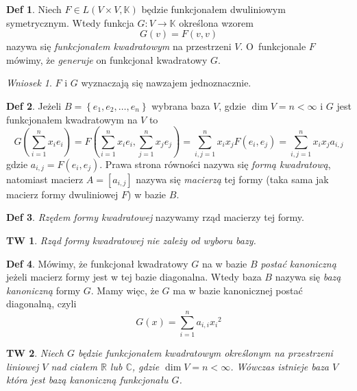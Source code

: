 \documentclass[a4paper, 12pt]{mwart}
\theoremstyle{definition}
\newtheorem{definicja}{Def}[section]
\theoremstyle{plain}
\newtheorem{twierdzenie}{TW}[section]
\theoremstyle{remark}
\newtheorem{wniosek}{Wniosek}[section]
\begin{document}
\begin{definicja}
	Niech $F \in L(V\times V, \mathbb{K})$ będzie funkcjonałem dwuliniowym symetrycznym. Wtedy funkcja $G\colon V\to \mathbb{K}$ określona wzorem
	\begin{equation}
		G(v) = F(v, v)
	\end{equation}
	nazywa się \emph{funkcjonałem kwadratowym} na przestrzeni $V$. O~funkcjonale $F$ mówimy, że \emph{generuje} on funkcjonał kwadratowy $G$.
\end{definicja}
\begin{wniosek}
	$F$ i $G$ wyznaczają się nawzajem jednoznacznie.
\end{wniosek}
\begin{definicja}
	Jeżeli $B = \left\{e_1, e_2, \ldots, e_n\right\}$ \ppauza wybrana baza $V$, gdzie $\dim V = n < \infty$ i $G$ jest funkcjonałem kwadratowym na $V$ to
	\begin{equation}
		G\left(\sum_{i = 1}^n x_ie_i\right) = F\left(\sum_{i = 1}^n x_ie_i, \sum_{j = 1}^n x_je_j\right) = \sum_{i, j = 1}^n x_ix_jF\left(e_i, e_j\right) = \sum_{i, j = 1}^n x_ix_ja_{i, j}
	\end{equation}
	gdzie $a_{i, j} = F\left(e_i, e_j\right)$. Prawa strona równości nazywa się \emph{formą kwadratową}, natomiast macierz $A = [a_{i, j}]$ nazywa się \emph{macierzą} tej formy (taka sama jak macierz formy dwuliniowej $F$) w bazie $B$.
\end{definicja}
\begin{definicja}
	\emph{Rzędem formy kwadratowej} nazywamy rząd macierzy tej formy.
\end{definicja}
\begin{twierdzenie}
	Rząd formy kwadratowej nie zależy od wyboru bazy.
\end{twierdzenie}
\begin{definicja}
	Mówimy, że funkcjonał kwadratowy $G$ na w bazie $B$ \emph{postać kanoniczną} jeżeli macierz formy jest w tej bazie diagonalna. Wtedy baza $B$ nazywa się \emph{bazą kanoniczną} formy $G$. Mamy więc, że $G$ ma w bazie kanonicznej postać diagonalną, czyli
	\begin{equation}
		G(x) = \sum_{i = 1}^{n} a_{i, i}{x_i}^2
	\end{equation}
\end{definicja}
\begin{twierdzenie}
	Niech $G$ będzie funkcjonałem kwadratowym określonym na przestrzeni liniowej $V$ nad ciałem $\mathbb{R}$ lub $\mathbb{C}$, gdzie $\dim V = n < \infty$. Wówczas istnieje baza $V$ która jest bazą kanoniczną funkcjonału $G$.
\end{twierdzenie}
\end{document}
